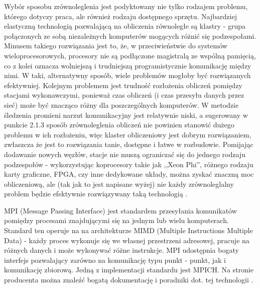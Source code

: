 Wybór sposobu zrównoleglenia jest podyktowany nie tylko rodzajem problemu, którego dotyczy praca, ale również rodzaju dostępnego sprzętu. Najbardziej elastyczną technologią pozwalającą na obliczenia równoległe są klastry - grupa połączonych ze sobą niezależnych komputerów mogących różnić się podzespołami. Minusem takiego rozwiązania jest to, że, w przeciwieństwie do systemów wieloprocesorowych, procesory nie są podłączone magistralą ze wspólną pamięcią, co z kolei oznacza wolniejszą i trudniejszą programistycznie komunikację między nimi. W taki, alternatywny sposób, wiele problemów mogłoby być rozwiązanych efektywniej. Kolejnym problemem jest trudność rozłożenia obliczeń pomiędzy stacjami wykonawczymi, ponieważ czas obliczeń (i czas przesyłu danych przez sieć) może być znacząco różny dla poszczególnych komputerów. W metodzie śledzenia promieni narzut komunikacyjny jest relatywnie niski, a sugerowany w punkcie 2.1.3 sposób zrównoleglenia obliczeń nie powinien stanowić dużego problemu w ich rozłożeniu, więc klaster obliczeniowy jest dobrym rozwiązaniem, zwłaszcza że jest to rozwiązania tanie, dostępne i łatwe w rozbudowie. Pomijając dodawanie nowych węzłów, stacje nie muszą ograniczać się do jednego rodzaju podzespołów - wykorzystując koprocesory takie jak ,,Xeon Phi'', różnego rodzaju karty graficzne, FPGA, czy inne dedykowane układy, można zyskać znaczną moc obliczeniową, ale (tak jak to jest napisane wyżej) nie każdy zrównoleglalny problem będzie efektywnie rozwiązywany taką technologią \cite{wikiPar}. 

MPI (Message Passing Interface) jest standardem przesyłania komunikatów pomiędzy procesami znajdującymi się na jednym lub wielu komputerach. Standard ten operuje na na architekturze MIMD (Multiple Instructions Multiple Data) - każdy proces wykonuje się we własnej przestrzeni adresowej, pracuje na różnych danych i może wykonywać różne instrukcje. MPI udostępnia bogaty interfejs pozwalający zarówno na komunikację typu punkt - punkt, jak i komunikację zbiorową. Jedną z implementacji standardu jest MPICH. Na stronie producenta można znaleźć bogatą dokumentację i poradniki dot. tej technologii \cite{mpich}. 